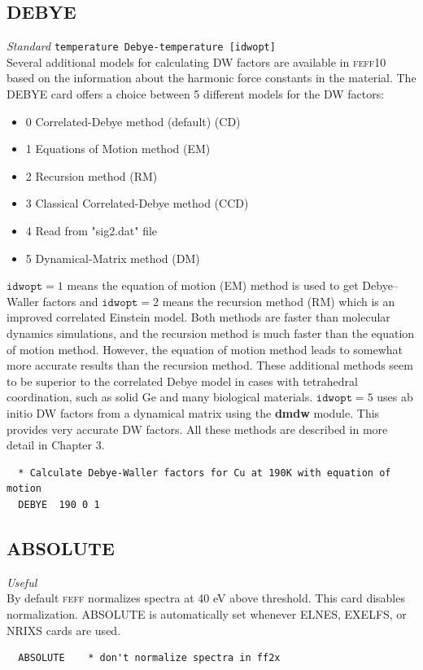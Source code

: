 \documentclass[11pt,oneside]{report} %
\newcommand{\feffcurrent}{\textsc{feff10}}
\renewcommand{\htmlref}[2]{\hyperlink{#2}{#1}}
\newcommand{\program}[1]{\textsc{#1}}
\newcommand{\feff}{\program{feff}}
\newenvironment{Card}[4]%
      {\vspace{3ex}%
        \subsection{#1}
        \quad\textsl{#3}\newline
        \quad\texttt{#2}\newline%
        \label{card:#4}\\}
      {}
\newcommand{\module}[1]{\textrm{\bf{#1}}}
\renewcommand{\htmlref}[2]{{#1}} %
\begin{document}
\begin{latexonly}
\begin{Card}{DEBYE}{temperature  Debye-temperature [idwopt]}{Standard}{deb2}
   Several additional models for
  calculating DW factors are available in {\feffcurrent} based on the information
  about the harmonic force constants in the material.  The \htmlref{DEBYE}{car:deb2} card offers a choice between 5 different models for the DW factors:
\begin{itemize}
				\item  0 	Correlated-Debye method  (default) (CD)
				\item  1	 Equations of Motion method (EM)
				\item  2	 Recursion method (RM)
				\item  3	 Classical Correlated-Debye method (CCD)
				\item  4	 Read from "sig2.dat" file
				\item  5	 Dynamical-Matrix method (DM)
\end{itemize}  
  $\mathtt{idwopt}=1$
  means the equation of motion (EM) method is used to get Debye--Waller
  factors and $\mathtt{idwopt}=2$ means the recursion method (RM) which
  is an improved correlated Einstein model. Both methods are faster than 
  molecular dynamics simulations, and the recursion method is much faster 
  than the equation of motion method. However, the equation of motion method 
  leads to somewhat more accurate results than the recursion method. These 
  additional methods seem to be superior to the correlated Debye model in cases 
  with tetrahedral coordination, such as solid Ge and many biological materials. 
  $\mathtt{idwopt}=5$ uses ab initio DW factors from a dynamical matrix using the \module{dmdw} module.  This provides very accurate DW factors.
  All these methods are described in more detail in \htmlref{Chapter 3}{ref:DWfactors}.

\begin{verbatim}
  * Calculate Debye-Waller factors for Cu at 190K with equation of motion
  DEBYE  190 0 1
\end{verbatim}
\end{Card}
\end{latexonly}



\begin{Card}{ABSOLUTE}{}{Useful}{abs}
  By default {\feff} normalizes spectra at 40 eV above threshold.  This card disables normalization.  ABSOLUTE is automatically
  set whenever ELNES,  EXELFS, or NRIXS cards are used.
\begin{verbatim}
  ABSOLUTE    * don't normalize spectra in ff2x
\end{verbatim}
\end{Card}
\end{document}
